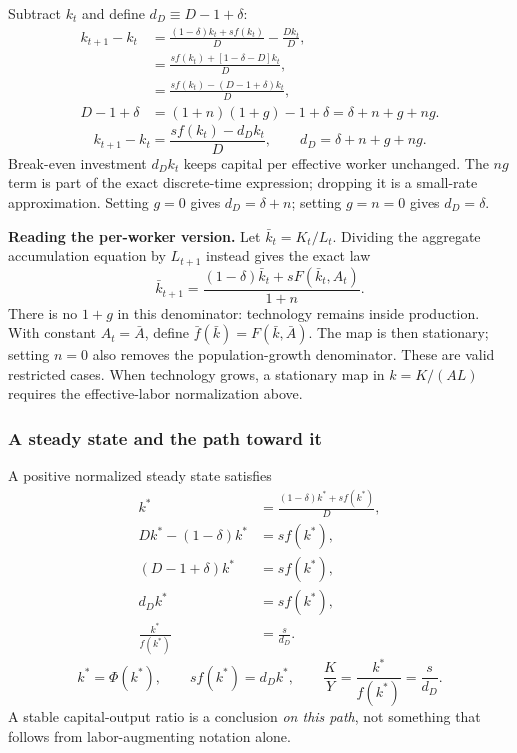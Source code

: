 Subtract $k_t$ and define $d_D\equiv D-1+\delta$:
\begin{align}
k_{t+1}-k_t
 &=\frac{(1-\delta)k_t+sf(k_t)}{D}-\frac{Dk_t}{D},\\
 &=\frac{sf(k_t)+[1-\delta-D]k_t}{D},\\
 &=\frac{sf(k_t)-(D-1+\delta)k_t}{D},\\
D-1+\delta&=(1+n)(1+g)-1+\delta
             =\delta+n+g+ng.
\end{align}
\begin{equation}\label{eq:solow-discrete-change}
k_{t+1}-k_t=\frac{sf(k_t)-d_Dk_t}{D},\qquad
 d_D=\delta+n+g+ng.
\end{equation}
Break-even investment $d_Dk_t$ keeps capital per effective worker unchanged.
The $ng$ term is part of the exact discrete-time expression; dropping it is a
small-rate approximation. Setting $g=0$ gives $d_D=\delta+n$; setting $g=n=0$
gives $d_D=\delta$.

\begin{blueblock}
\textbf{Reading the per-worker version.}
Let $\bar k_t=K_t/L_t$. Dividing the aggregate accumulation equation by
$L_{t+1}$ instead gives the exact law
\[
\bar k_{t+1}=\frac{(1-\delta)\bar k_t+sF(\bar k_t,A_t)}{1+n}.
\]
There is no $1+g$ in this denominator: technology remains inside production.
With constant $A_t=\bar A$, define $\bar f(\bar k)=F(\bar k,\bar A)$.
The map is then stationary; setting $n=0$ also removes the population-growth
denominator. These are valid restricted cases. When technology grows, a
stationary map in $k=K/(AL)$ requires the effective-labor normalization above.
\end{blueblock}

\subsubsection{A steady state and the path toward it}

A positive normalized steady state satisfies
\begin{align}
k^*&=\frac{(1-\delta)k^*+sf(k^*)}{D},\\
Dk^*-(1-\delta)k^*&=sf(k^*),\\
(D-1+\delta)k^*&=sf(k^*),\\
d_Dk^*&=sf(k^*),\\
\frac{k^*}{f(k^*)}&=\frac{s}{d_D}.
\end{align}
\begin{equation}\label{eq:solow-discrete-steady}
k^*=\Phi(k^*),\qquad sf(k^*)=d_Dk^*,\qquad
\frac{K}{Y}=\frac{k^*}{f(k^*)}=\frac{s}{d_D}.
\end{equation}
A stable capital-output ratio is a conclusion \emph{on this path}, not something
that follows from labor-augmenting notation alone.

